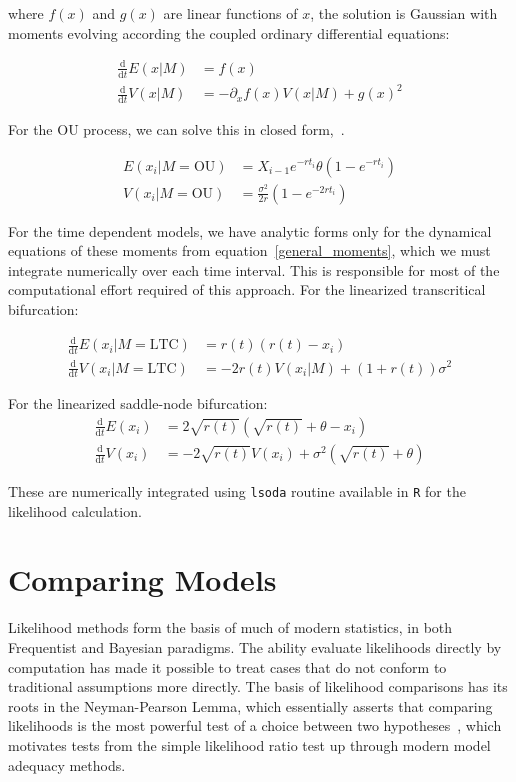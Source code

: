 \documentclass[authoryear, preprint,review,12pt]{elsarticle}
\newcommand{\ud}{\mathrm{d}}
\begin{document}
where $f(x)$ and $g(x)$ are linear functions of $x$, the solution is Gaussian with moments evolving according the coupled ordinary differential equations:

\begin{align}
 \frac{\ud }{\ud t} E(x| M)&=  f(x) \\
\frac{\ud}{\ud t} V(x| M) &=  -\partial_x f(x) V(x|M) + g(x)^2 
  \label{general_moments}
\end{align}

For the OU process, we can solve this in closed form,~\citep{Gardiner2009}. 


\begin{align}
  E(x_i| M = \text{OU}) &= X_{i-1} e^{-r t_i} \theta \left(1 - e^{-rt_i} \right) \\
V(x_i| M = \text{OU}) &= \frac{\sigma^2}{2 r} \left(1 - e^{-2 r t_i} \right)
\label{OUsoln}
\end{align}

For the time dependent models, we have analytic forms only for the dynamical equations of these moments from equation~\eqref{general_moments}, which we must integrate numerically over each time interval.  This is responsible for most of the computational effort required of this approach.  For the linearized transcritical bifurcation:

\begin{align}
\frac{\ud }{\ud t} E(x_i| M = \text{LTC})&=  r(t)(r(t) - x_i) \\
\frac{\ud}{\ud t} V(x_i| M = \text{LTC}) &=  -2 r(t) V(x_i|M) + (1+r(t))\sigma^2 
\label{LTCsoln}
\end{align}

For the linearized saddle-node bifurcation:
\begin{align}
\frac{\ud }{\ud t} E(x_i)&=  2\sqrt{r(t)}(\sqrt{r(t)}+\theta - x_i) \\
\frac{\ud}{\ud t} V(x_i) &=  -2 \sqrt{r(t)} V(x_i) + \sigma^2 ( \sqrt{r(t)}+\theta )
\label{LSNsoln}
\end{align}

These are numerically integrated using \texttt{lsoda} routine available in \texttt{R} for the likelihood calculation.  

\section{Comparing Models}\label{Cox}
Likelihood methods form the basis of much of modern statistics, in both Frequentist and Bayesian paradigms.  
The ability evaluate likelihoods directly by computation has made it possible to treat cases that do not conform to traditional assumptions more directly.
The basis of likelihood comparisons has its roots in the Neyman-Pearson Lemma, 
which essentially asserts that comparing likelihoods is the most powerful test
of a choice between two hypotheses~\citep{Neyman1933}, which motivates
tests from the simple likelihood ratio test up through modern model adequacy methods.
\end{document}
